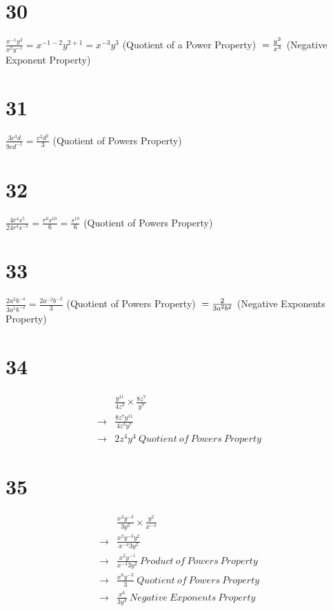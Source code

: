 \documentclass{article}
\theoremstyle{definition}
\begin{document}
\section*{30}
$\frac{x^{-1}y^2}{x^2y^{-1}}=x^{-1-2}y^{2+1}=x^{-3}y^3$ (Quotient of a Power Property)
$\newline =\frac{y^3}{x^3}$ (Negative Exponent Property)

\section*{31}
$\frac{3c^3d}{9cd^{-1}}=\frac{c^2d^2}{3}$ (Quotient of Powers Property)

\section*{32}
$\frac{4r^4s^5}{24r^4s^{-5}}=\frac{r^0s^{10}}{6}=\frac{s^{10}}{6}$ (Quotient of Powers Property)

\section*{33}
$\frac{2a^3b^{-4}}{3a^5b^{-2}}=\frac{2a^{-2}b^{-2}}{3}$ (Quotient of Powers Property)
$\newline =\frac{2}{3a^2b^2}$ (Negative Exponents Property)

\section*{34}
\[
\begin{array}{rl}
            & \frac{y^{11}}{4z^3}\times\frac{8z^7}{y^7} \\
\rightarrow & \frac{8z^7y^{11}}{4z^3y^7} \\
\rightarrow & 2z^4y^4\ Quotient\ of\ Powers\ Property
\end{array}
\]

\section*{35}
\[
\begin{array}{rl}
            & \frac{x^2y^{-3}}{3y^2}\times \frac{y^2}{x^{-4}} \\
\rightarrow & \frac{x^2y^{-3}y^2}{x^{-4}3y^2} \\
\rightarrow & \frac{x^2y^{-1}}{x^{-4}3y^2}\ Product\ of\ Powers\ Property \\
\rightarrow & \frac{x^6y^{-3}}{3}\ Quotient\ of\ Powers\ Property \\
\rightarrow & \frac{x^6}{3y^3}\ Negative\ Exponents\ Property
\end{array}
\]
\end{document}
